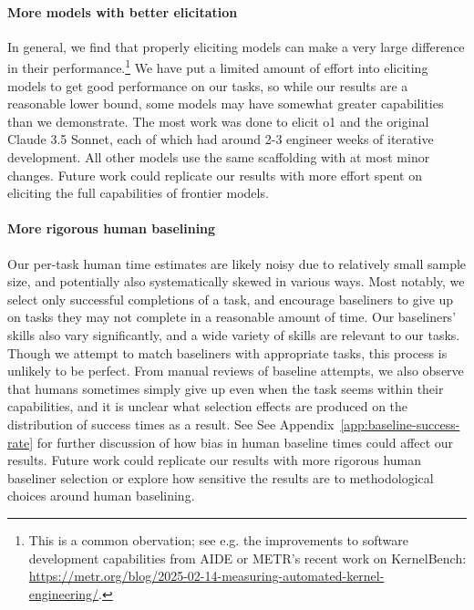 \documentclass{article}
\begin{document}
\paragraph{More models with better elicitation}\label{sec:more_elicitation}
In general, we find that properly eliciting models can make a very large difference in their performance.\footnote{This is a common obervation; see e.g. the improvements to software development capabilities from AIDE \cite{jiang2025aide}
or METR's recent work on KernelBench: \url{https://metr.org/blog/2025-02-14-measuring-automated-kernel-engineering/}.}
We have put a limited amount of effort into eliciting models to get good performance on our tasks, so while our results are a reasonable lower bound, some models may have somewhat greater capabilities than we demonstrate. 
The most work was done to elicit o1 and the original Claude 3.5 Sonnet, each of which had around 2-3 engineer weeks of iterative development. All other models use the same scaffolding with at most minor changes. 
Future work could replicate our results with more effort spent on eliciting the full capabilities of frontier models. 

\paragraph{More rigorous human baselining}
Our per-task human time estimates are likely noisy due to relatively small sample size, and potentially also systematically skewed in various ways. 
Most notably, we select only successful completions of a task, and encourage baseliners to give up on tasks they may not complete in a reasonable amount of time. 
Our baseliners' skills also vary significantly, and a wide variety of skills are relevant to our tasks. 
Though we attempt to match baseliners with appropriate tasks, this process is unlikely to be perfect. 
From manual reviews of baseline attempts, we also observe that humans sometimes simply give up even when the task seems within their capabilities, and it is unclear what selection effects are produced on the distribution of success times as a result.
See See Appendix~\ref{app:baseline-success-rate} for further discussion of how bias in human baseline times could affect our results. Future work could replicate our results with more rigorous human baseliner selection or explore how sensitive the results are to methodological choices around human baselining. 
\end{document}
